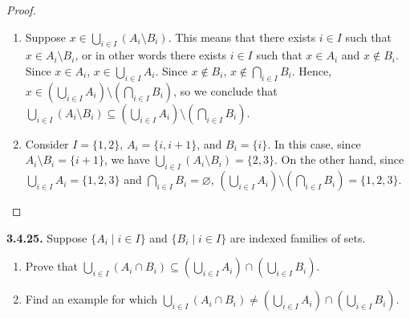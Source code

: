 \documentclass[12pt]{amsart}
\newenvironment{statement}[1]{\smallskip\noindent\color[rgb]{.6627, .3529, .6314} {\bf #1.}}{}
\theoremstyle{definition}
\theoremstyle{remark}
\begin{document}
\begin{proof}
\hfill
\begin{enumerate}
	\item Suppose $x \in \bigcup_{i \in I} (A_i \setminus B_i)$.
	This means that there exists $i \in I$ such that $x \in A_i \setminus B_i$, or in other words
	there exists $i \in I$ such that $x \in A_i$ and $x \notin B_i$.
	Since $x \in A_i$, $x \in \bigcup_{i \in I} A_i$.
	Since $x \notin B_i$, $x \notin \bigcap_{i \in I} B_i$.
	Hence, $x \in \left( \bigcup_{i \in I} A_i \right) \setminus \left( \bigcap_{i \in I} B_i \right)$,
	so we conclude that 
	$\bigcup_{i \in I} (A_i \setminus B_i) \subseteq
	\left( \bigcup_{i \in I} A_i \right) \setminus \left( \bigcap_{i \in I} B_i \right)$.
	
	\item Consider $I = \{ 1, 2 \}$, $A_i = \{ i, i + 1 \}$, and $B_i = \{ i \}$.
	In this case, since $A_i \setminus B_i = \{ i + 1 \}$, we have
	$\bigcup_{i \in I} (A_i \setminus B_i) = \{ 2, 3 \}$.
	On the other hand, since $\bigcup_{i \in I} A_i = \{ 1, 2, 3 \}$ and 
	$\bigcap_{i \in I} B_i = \varnothing$, 
	$\left( \bigcup_{i \in I} A_i \right) \setminus \left( \bigcap_{i \in I} B_i \right) = \{ 1, 2, 3 \}$.
\end{enumerate}
\end{proof}


\begin{statement}{3.4.25}
Suppose $\{ A_i \mid i \in I \}$ and $\{ B_i \mid i \in I \}$ are indexed families of sets.
\begin{enumerate}
	\item Prove that $\bigcup_{i \in I} (A_i \cap B_i) \subseteq
	\left( \bigcup_{i \in I} A_i \right) \cap \left( \bigcup_{i \in I} B_i \right)$.
	
	\item Find an example for which $\bigcup_{i \in I} (A_i \cap B_i) \neq
	\left( \bigcup_{i \in I} A_i \right) \cap \left( \bigcup_{i \in I} B_i \right)$.
\end{enumerate}
\end{statement}
\end{document}
